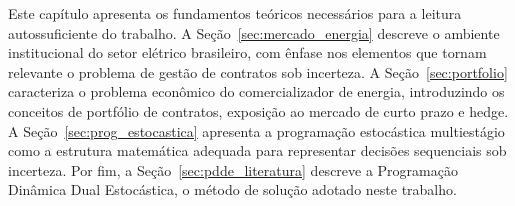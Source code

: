 Este capítulo apresenta os fundamentos teóricos necessários para a leitura autossuficiente do trabalho. A Seção~\ref{sec:mercado_energia} descreve o ambiente institucional do setor elétrico brasileiro, com ênfase nos elementos que tornam relevante o problema de gestão de contratos sob incerteza. A Seção~\ref{sec:portfolio} caracteriza o problema econômico do comercializador de energia, introduzindo os conceitos de portfólio de contratos, exposição ao mercado de curto prazo e hedge. A Seção~\ref{sec:prog_estocastica} apresenta a programação estocástica multiestágio como a estrutura matemática adequada para representar decisões sequenciais sob incerteza. Por fim, a Seção~\ref{sec:pdde_literatura} descreve a Programação Dinâmica Dual Estocástica, o método de solução adotado neste trabalho.








